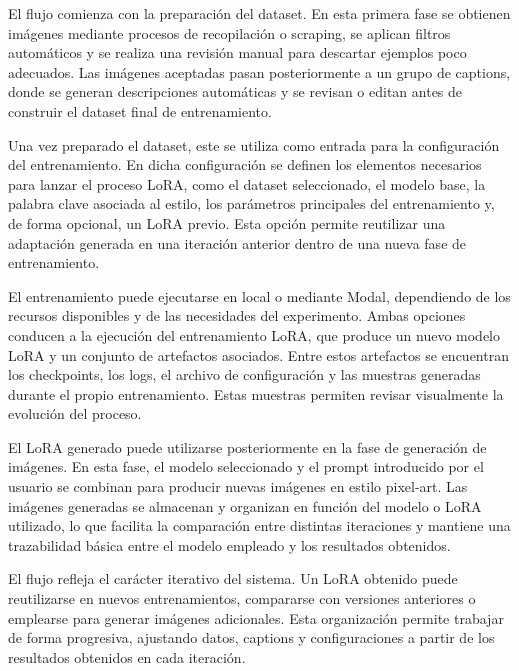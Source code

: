 \documentclass[a4paper,11pt,titlepage]{scrbook}
\begin{document}
\medskip

El flujo comienza con la preparación del dataset. En esta primera fase se obtienen imágenes mediante procesos de recopilación o scraping, se aplican filtros automáticos y se realiza una revisión manual para descartar ejemplos poco adecuados. Las imágenes aceptadas pasan posteriormente a un grupo de captions, donde se generan descripciones automáticas y se revisan o editan antes de construir el dataset final de entrenamiento.

\medskip

Una vez preparado el dataset, este se utiliza como entrada para la configuración del entrenamiento. En dicha configuración se definen los elementos necesarios para lanzar el proceso LoRA, como el dataset seleccionado, el modelo base, la palabra clave asociada al estilo, los parámetros principales del entrenamiento y, de forma opcional, un LoRA previo. Esta opción permite reutilizar una adaptación generada en una iteración anterior dentro de una nueva fase de entrenamiento.

\medskip

El entrenamiento puede ejecutarse en local o mediante Modal, dependiendo de los recursos disponibles y de las necesidades del experimento. Ambas opciones conducen a la ejecución del entrenamiento LoRA, que produce un nuevo modelo LoRA y un conjunto de artefactos asociados. Entre estos artefactos se encuentran los checkpoints, los logs, el archivo de configuración y las muestras generadas durante el propio entrenamiento. Estas muestras permiten revisar visualmente la evolución del proceso.

\medskip

El LoRA generado puede utilizarse posteriormente en la fase de generación de imágenes. En esta fase, el modelo seleccionado y el prompt introducido por el usuario se combinan para producir nuevas imágenes en estilo pixel-art. Las imágenes generadas se almacenan y organizan en función del modelo o LoRA utilizado, lo que facilita la comparación entre distintas iteraciones y mantiene una trazabilidad básica entre el modelo empleado y los resultados obtenidos.

\medskip

El flujo refleja el carácter iterativo del sistema. Un LoRA obtenido puede reutilizarse en nuevos entrenamientos, compararse con versiones anteriores o emplearse para generar imágenes adicionales. Esta organización permite trabajar de forma progresiva, ajustando datos, captions y configuraciones a partir de los resultados obtenidos en cada iteración.
\end{document}
